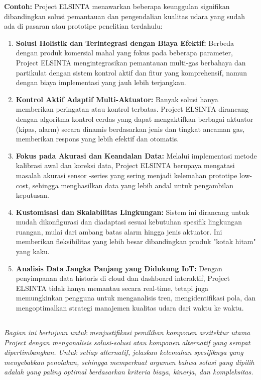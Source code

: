 \documentclass{elsinta}
\begin{document}
\textbf{Contoh: } Project ELSINTA menawarkan beberapa keunggulan signifikan dibandingkan solusi pemantauan dan pengendalian kualitas udara yang sudah ada di pasaran atau prototipe penelitian terdahulu:
\begin{enumerate}
    \item \textbf{Solusi Holistik dan Terintegrasi dengan Biaya Efektif:} Berbeda dengan produk komersial mahal yang fokus pada beberapa parameter, Project ELSINTA mengintegrasikan pemantauan multi-gas berbahaya dan partikulat dengan sistem kontrol aktif dan fitur  yang komprehensif, namun dengan biaya implementasi yang jauh lebih terjangkau.
    \item \textbf{Kontrol Aktif Adaptif Multi-Aktuator:} Banyak solusi hanya memberikan peringatan atau kontrol terbatas. Project ELSINTA dirancang dengan algoritma kontrol cerdas yang dapat mengaktifkan berbagai aktuator (kipas, alarm) secara dinamis berdasarkan jenis dan tingkat ancaman gas, memberikan respons yang lebih efektif dan otomatis.
    \item \textbf{Fokus pada Akurasi dan Keandalan Data:} Melalui implementasi metode kalibrasi awal dan koreksi data, Project ELSINTA berupaya mengatasi masalah akurasi sensor -series yang sering menjadi kelemahan prototipe low-cost, sehingga menghasilkan data yang lebih andal untuk pengambilan keputusan.
    \item \textbf{Kustomisasi dan Skalabilitas Lingkungan:} Sistem ini dirancang untuk mudah dikonfigurasi dan diadaptasi sesuai kebutuhan spesifik lingkungan ruangan, mulai dari ambang batas alarm hingga jenis aktuator. Ini memberikan fleksibilitas yang lebih besar dibandingkan produk "kotak hitam" yang kaku.
    \item \textbf{Analisis Data Jangka Panjang yang Didukung IoT:} Dengan penyimpanan data historis di cloud dan dashboard interaktif, Project ELSINTA tidak hanya memantau secara real-time, tetapi juga memungkinkan pengguna untuk menganalisis tren, mengidentifikasi pola, dan mengoptimalkan strategi manajemen kualitas udara dari waktu ke waktu.
\end{enumerate}

\subsection{\AlternativeDesignTitle}

\subsection{\JustificationTitle}
\textit{Bagian ini bertujuan untuk menjustifikasi pemilihan komponen arsitektur utama Project dengan menganalisis solusi-solusi atau komponen alternatif yang sempat dipertimbangkan. Untuk setiap alternatif, jelaskan kelemahan spesifiknya yang menyebabkan penolakan, sehingga memperkuat argumen bahwa solusi yang dipilih adalah yang paling optimal berdasarkan kriteria biaya, kinerja, dan kompleksitas.}
\end{document}
